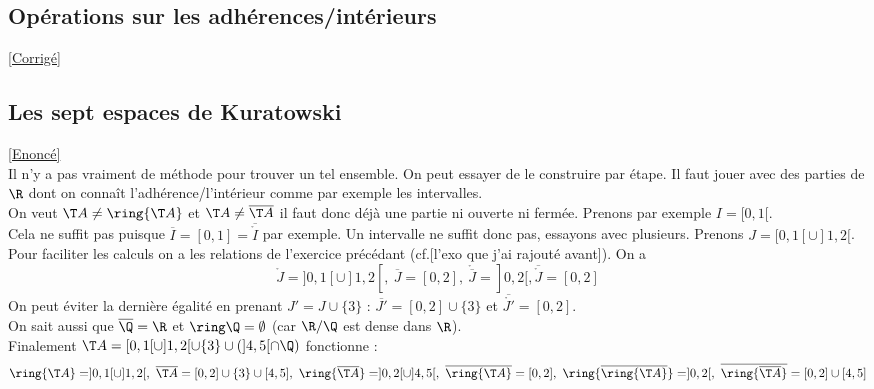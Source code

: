 \documentclass{book}
\begin{document}
	\subsection{Opérations sur les adhérences/intérieurs}
	\label{Opérations sur les adhérences/intérieurs corrigé}
	\textcolor{blue}{\hyperref[Opérations sur les adhérences/intérieurs]{[Corrigé]}}\\
	
	\subsection{Les sept espaces de Kuratowski }
	\label{sec:les-sept-espaces-de-kuratowski}
	\textcolor{blue}{\hyperref[Les sept espaces de Kuratowski]{[Enoncé]}}\\
	Il n'y a pas vraiment de méthode pour trouver un tel ensemble. On peut essayer de le construire par étape. Il faut jouer avec des parties de $\R$ dont on connaît l'adhérence/l'intérieur comme par exemple les intervalles.\\
	On veut $\T A\ne\ring{\T A}$ et $\T A\ne \overline{\T A}$ il faut donc déjà une partie ni ouverte ni fermée. Prenons par exemple $I=[0,1[$.\\
	Cela ne suffit pas puisque $\overline I=[0,1]=\overline{\ring I}$ par exemple. Un intervalle ne suffit donc pas, essayons avec plusieurs. Prenons $J=[0,1[\cup ]1,2[$. Pour faciliter les calculs on a les relations de l'exercice précédant (cf.[l'exo que j'ai rajouté avant]).
	On a
	$$\ring J=]0,1[\cup]1,2[,\ \overline J=[0,2],\ \ring{\overline J}=]0,2[, \overline{\ring J}=[0,2]$$
	On peut éviter la dernière égalité en prenant $J'=J\cup \{3\}$ : $\overline{J'}=[0,2]\cup\{3\}$ et $\overline{\ring{J'}}=[0,2]$.\\
	On sait aussi que $\overline \Q=\R$ et $\ring \Q=\emptyset$ (car $\R/\Q$ est dense dans $\R$).\\
	Finalement $\T A=[0,1[\cup]1,2[\cup\{3\}\cup(]4,5[\cap\Q)$ fonctionne :
	$$\ring{\T A}=]0,1[\cup ]1,2[,\ \overline{\T A}=[0,2]\cup\{3\}\cup[4,5],\ \ring{\overline{\T A}}=]0,2[\cup]4,5[,\ \overline{\ring{\T A}}=[0,2],\ \ring{\overline{\ring{\T A}}}=]0,2[,\ \overline{\ring{\overline{\T A}}}=[0,2]\cup[4,5]$$
\end{document}
